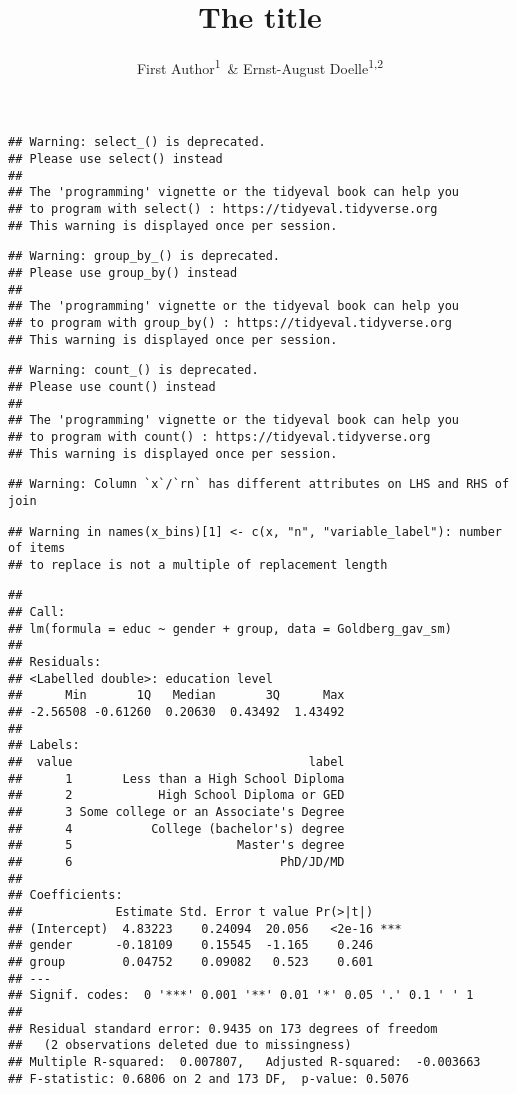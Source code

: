 \documentclass[man]{apa6}
\title{The title}
\author{First Author\textsuperscript{1}~\& Ernst-August Doelle\textsuperscript{1,2}}
\date{}
\affiliation{
\vspace{0.5cm}
\textsuperscript{1} Wilhelm-Wundt-University\\\textsuperscript{2} Konstanz Business School}
\begin{document}
\maketitle

\begin{verbatim}
## Warning: select_() is deprecated. 
## Please use select() instead
## 
## The 'programming' vignette or the tidyeval book can help you
## to program with select() : https://tidyeval.tidyverse.org
## This warning is displayed once per session.
\end{verbatim}

\begin{verbatim}
## Warning: group_by_() is deprecated. 
## Please use group_by() instead
## 
## The 'programming' vignette or the tidyeval book can help you
## to program with group_by() : https://tidyeval.tidyverse.org
## This warning is displayed once per session.
\end{verbatim}

\begin{verbatim}
## Warning: count_() is deprecated. 
## Please use count() instead
## 
## The 'programming' vignette or the tidyeval book can help you
## to program with count() : https://tidyeval.tidyverse.org
## This warning is displayed once per session.
\end{verbatim}

\begin{verbatim}
## Warning: Column `x`/`rn` has different attributes on LHS and RHS of join
\end{verbatim}

\begin{verbatim}
## Warning in names(x_bins)[1] <- c(x, "n", "variable_label"): number of items
## to replace is not a multiple of replacement length
\end{verbatim}

\begin{verbatim}
## 
## Call:
## lm(formula = educ ~ gender + group, data = Goldberg_gav_sm)
## 
## Residuals:
## <Labelled double>: education level
##      Min       1Q   Median       3Q      Max 
## -2.56508 -0.61260  0.20630  0.43492  1.43492 
## 
## Labels:
##  value                                 label
##      1       Less than a High School Diploma
##      2            High School Diploma or GED
##      3 Some college or an Associate's Degree
##      4           College (bachelor's) degree
##      5                       Master's degree
##      6                             PhD/JD/MD
## 
## Coefficients:
##             Estimate Std. Error t value Pr(>|t|)    
## (Intercept)  4.83223    0.24094  20.056   <2e-16 ***
## gender      -0.18109    0.15545  -1.165    0.246    
## group        0.04752    0.09082   0.523    0.601    
## ---
## Signif. codes:  0 '***' 0.001 '**' 0.01 '*' 0.05 '.' 0.1 ' ' 1
## 
## Residual standard error: 0.9435 on 173 degrees of freedom
##   (2 observations deleted due to missingness)
## Multiple R-squared:  0.007807,   Adjusted R-squared:  -0.003663 
## F-statistic: 0.6806 on 2 and 173 DF,  p-value: 0.5076
\end{verbatim}
\end{document}
